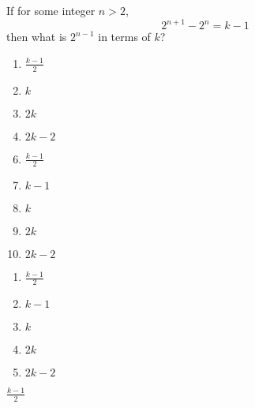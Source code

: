 


 If for some integer $n>2$, \[2^{n+1}-2^{n}=k-1\] then what is $2^{n-1}$ in terms of $k$?\\




\ifsat
	\begin{enumerate}[label=\Alph*)]
		\item   $\frac{k-1}{2}$%
		\item  $k$
		\item  $2k$
		\item   $2k-2$
	\end{enumerate}
\else
\fi

\ifacteven
	\begin{enumerate}[label=\textbf{\Alph*.},itemsep=\fill,align=left]
		\setcounter{enumii}{5}
		\item   $\frac{k-1}{2}$%
		\item  $k-1$
		\item  $k$
		\addtocounter{enumii}{1}
		\item  $2k$
		\item   $2k-2$
	\end{enumerate}
\else
\fi

\ifactodd
	\begin{enumerate}[label=\textbf{\Alph*.},itemsep=\fill,align=left]
		\item   $\frac{k-1}{2}$%
		\item  $k-1$
		\item  $k$
		\item  $2k$
		\item   $2k-2$
	\end{enumerate}
\else
\fi

\ifgridin
   $\frac{k-1}{2}$%
		
\else
\fi

